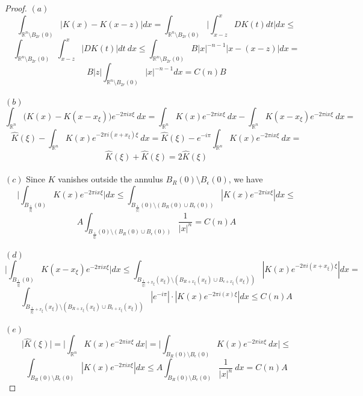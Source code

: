\documentclass[12pt]{article}
\newenvironment{exercise}[2][Exercise]{\begin{trivlist}
\item[\hskip \labelsep {\bfseries #1}\hskip \labelsep {\bfseries #2.}]}{\end{trivlist}}
\begin{document}
\begin{proof}
  $(a)$
  $$\int_{\mathbb{R}^n \setminus B_{2r}(0)} |K(x) - K(x-z)| dx = \int_{\mathbb{R}^n \setminus B_{2r}(0)} \Big| \int_{x-z}^{x} DK(t) dt \Big| dx \le$$
  $$\int_{\mathbb{R}^n \setminus B_{2r}(0)} \int_{x-z}^{x} \Big|DK(t)\Big| dt\ dx \le \int_{\mathbb{R}^n \setminus B_{2r}(0)} B |x|^{-n-1} |x - (x-z)| dx =$$
  $$B |z| \int_{\mathbb{R}^n \setminus B_{2r}(0)} |x|^{-n-1}dx = C(n)B$$\\
  $(b)$
  $$\int_{\mathbb{R}^n} \Big( K(x) - K(x - x_{\xi}) \Big) e^{-2 \pi i x \xi}\ dx = \int_{\mathbb{R}^n} K(x) e^{-2 \pi i x \xi}\ dx - \int_{\mathbb{R}^n} K(x-x_\xi) e^{-2 \pi i x \xi}\ dx =$$
  $$\hat{K}(\xi) - \int_{\mathbb{R}^n} K(x) e^{-2 \pi i (x + x_\xi) \xi}\ dx = \hat{K}(\xi) - e^{-i \pi} \int_{\mathbb{R}^n} K(x) e^{-2 \pi i x \xi}\ dx =$$
  $$\hat{K}(\xi) + \hat{K}(\xi) = 2 \hat{K}(\xi)$$\\
  $(c)$ Since $K$ vanishes outside the annulus $B_R(0) \setminus B_\epsilon(0)$, we have
  $$\Big| \int_{B_\frac{1}{|\xi|}(0)} K(x)e^{-2 \pi i x \xi} \Big| dx \le \int_{B_\frac{1}{|\xi|}(0) \setminus  (B_R(0) \cup B_\epsilon(0))} |K(x)e^{-2 \pi i x \xi}| dx \le$$
  $$A \int_{B_\frac{1}{|\xi|}(0) \setminus  (B_R(0) \cup B_\epsilon(0))} \dfrac{1}{|x|^n} = C(n)A$$\\
  $(d)$
  $$\Big| \int_{B_\frac{1}{|\xi|}(0)} K(x-x_\xi)e^{-2 \pi i x \xi} \Big| dx \le \int_{B_{\frac{1}{|\xi|}+x_\xi}(x_\xi) \setminus  (B_{R+x_\xi}(x_\xi) \cup B_{\epsilon+x_\xi}(x_\xi))} |K(x)e^{-2 \pi i (x+x_\xi) \xi}| dx =$$ $$\int_{B_{\frac{1}{|\xi|}+x_\xi}(x_\xi) \setminus  (B_{R+x_\xi}(x_\xi) \cup B_{\epsilon+x_\xi}(x_\xi))} |e^{-i \pi}| \cdot |K(x)e^{-2 \pi i (x) \xi}| dx \le C(n) A$$\\
  $(e)$
  $$\Big| \hat{K}(\xi) \Big| = \Big| \int_{\mathbb{R}^n} K(x) e^{-2 \pi i x \xi}\ dx \Big| = \Big| \int_{B_R(0) \setminus B_\epsilon(0)} K(x) e^{-2 \pi i x \xi}\ dx \Big| \le$$
  $$\int_{B_R(0) \setminus B_\epsilon(0)} |K(x) e^{-2 \pi i x \xi}| dx \le A \int_{B_R(0) \setminus B_\epsilon(0)} \frac{1}{|x|^n}\ dx = C(n) A$$
\end{proof}

\begin{exercise}{3}
\end{exercise}
\end{document}
